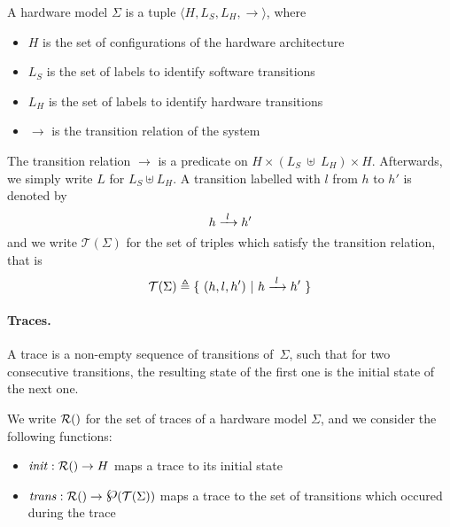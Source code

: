 \begin{definition}
  \label{def:speccert:model}
  A hardware model $\Sigma$ is a tuple
  $\langle H, L_S, L_H, \rightarrow \rangle$, where
  \begin{itemize}
  \item $H$ is the set of configurations of the hardware architecture
  \item $L_S$ is the set of labels to identify software transitions
  \item $L_H$ is the set of labels to identify hardware transitions
  \item $\rightarrow$ is the transition relation of the system
  \end{itemize}

  The transition relation $\rightarrow$ is a predicate on
  $H \times (L_S~\uplus~L_H) \times H$.
  Afterwards, we simply write $L$ for $L_S \uplus L_H$.
  A transition labelled with $l$ from $h$ to $h'$ is denoted by
  \[
    h \xrightarrow{\hskip0.3em\relax l\hskip0.3em\relax} h'
  \]
  and we write $\mathcal{T}(\Sigma)$ for the set of triples which satisfy the
  transition relation, that is
  \[
    \mathcal{T}(\Sigma) \triangleq \{\ (h, l, h')\ |\ h \xrightarrow{\hskip0.3em\relax l\hskip0.3em\relax} h'\ \}
  \]
\end{definition}


\paragraph{Traces.}
A trace is a non-empty sequence of transitions of~$\Sigma$, such that for two
consecutive transitions, the resulting state of the first one is the initial
state of the next one.
%

\begin{definition}[Traces]
  \label{def:speccert:trace}
  We write $\pathesLTS{Ez}$ for the set of traces of a hardware model $\Sigma$,
  and we consider the following functions:
  \begin{itemize}
  \item $\func{init} : \pathesLTS{Ez} \rightarrow H$ maps a trace to its initial
    state
  \item
    $\func{trans} : \pathesLTS{Ez} \rightarrow \powerset(\mathcal{T}(\Sigma))$
    maps a trace to the set of transitions which occured during the trace
  \end{itemize}
\end{definition}

